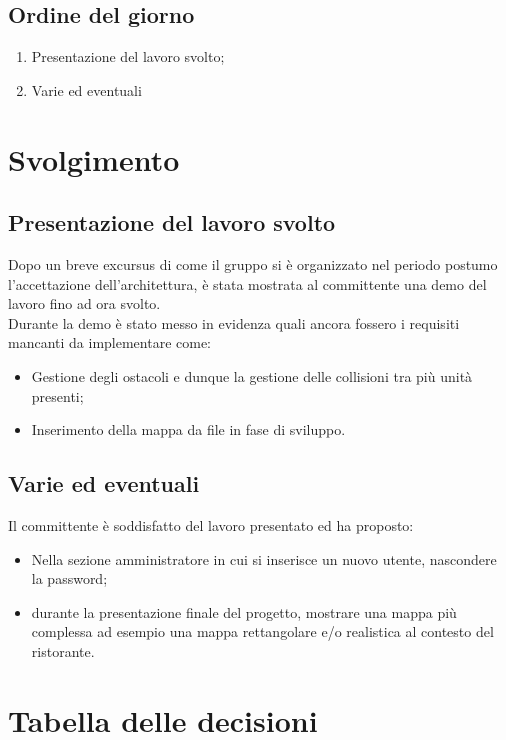 \documentclass[]{article}
\begin{document}
	\subsection{Ordine del giorno}
	\begin{enumerate}
		\item Presentazione del lavoro svolto;
		\item Varie ed eventuali
	\end{enumerate}
	\newpage
	\section{Svolgimento}


	\subsection{Presentazione del lavoro svolto}
	Dopo un breve excursus di come il gruppo si è organizzato nel periodo postumo l'accettazione dell'architettura, è stata mostrata al committente una demo del lavoro fino ad ora svolto.\\
	Durante la demo è stato messo in evidenza quali ancora fossero i requisiti mancanti da implementare come:
	\begin{itemize}
		\item Gestione degli ostacoli e dunque la gestione delle collisioni tra più unità presenti;
		\item Inserimento della mappa da file in fase di sviluppo.
	\end{itemize} 
	
	\subsection{Varie ed eventuali}
	Il committente è soddisfatto del lavoro presentato ed ha proposto:
	\begin{itemize}
		\item Nella sezione amministratore in cui si inserisce un nuovo utente, nascondere la password;
		\item durante la presentazione finale del progetto, mostrare una mappa più complessa ad esempio una mappa rettangolare e/o realistica al contesto del ristorante.
	\end{itemize}
	

	\newpage

	\section{Tabella delle decisioni}
\end{document}
